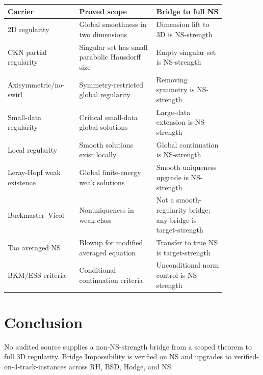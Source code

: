 \documentclass{article}
\begin{document}
\begin{center}
\begin{tabular}{p{0.25\linewidth}p{0.31\linewidth}p{0.29\linewidth}}
\toprule
Carrier & Proved scope & Bridge to full NS\\
\midrule
2D regularity & Global smoothness in two dimensions & Dimension lift to 3D is NS-strength\\
CKN partial regularity & Singular set has small parabolic Hausdorff size & Empty singular set is NS-strength\\
Axisymmetric/no-swirl & Symmetry-restricted global regularity & Removing symmetry is NS-strength\\
Small-data regularity & Critical small-data global solutions & Large-data extension is NS-strength\\
Local regularity & Smooth solutions exist locally & Global continuation is NS-strength\\
Leray-Hopf weak existence & Global finite-energy weak solutions & Smooth uniqueness upgrade is NS-strength\\
Buckmaster--Vicol & Nonuniqueness in weak class & Not a smooth-regularity bridge; any bridge is target-strength\\
Tao averaged NS & Blowup for modified averaged equation & Transfer to true NS is target-strength\\
BKM/ESS criteria & Conditional continuation criteria & Unconditional norm control is NS-strength\\
\bottomrule
\end{tabular}
\end{center}

\section{Conclusion}

No audited source supplies a non-NS-strength bridge from a scoped theorem to full 3D regularity. Bridge Impossibility is verified on NS and upgrades to verified-on-4-track-instances across RH, BSD, Hodge, and NS.
\end{document}

